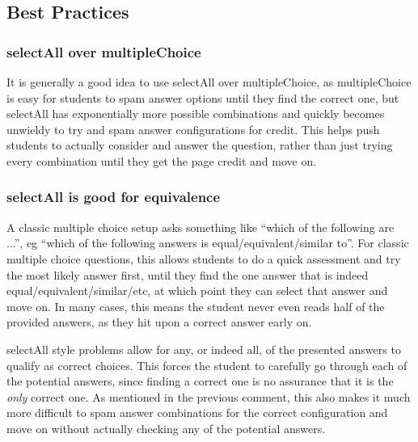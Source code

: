 \documentclass{ximera}
\begin{document}
    \subsection*{Best Practices}
    
        \subsubsection*{selectAll over multipleChoice}
            It is generally a good idea to use selectAll over multipleChoice, as multipleChoice is easy for students to spam answer options until they find the correct one, but selectAll has exponentially more possible combinations and quickly becomes unwieldy to try and spam answer configurations for credit. This helps push students to actually consider and answer the question, rather than just trying every combination until they get the page credit and move on.
        
        \subsubsection*{selectAll is good for equivalence}
            A classic multiple choice setup asks something like ``which of the following are ...'', eg ``which of the following answers is equal/equivalent/similar to''. For classic multiple choice questions, this allows students to do a quick assessment and try the most likely answer first, until they find the one answer that is indeed equal/equivalent/similar/etc, at which point they can select that answer and move on. In many cases, this means the student never even reads half of the provided answers, as they hit upon a correct answer early on.
            
            selectAll style problems allow for any, or indeed all, of the presented answers to qualify as correct choices. This forces the student to carefully go through each of the potential answers, since finding a correct one is no assurance that it is the \textit{only} correct one. As mentioned in the previous comment, this also makes it much more difficult to spam answer combinations for the correct configuration and move on without actually checking any of the potential answers.
        
\end{document}
